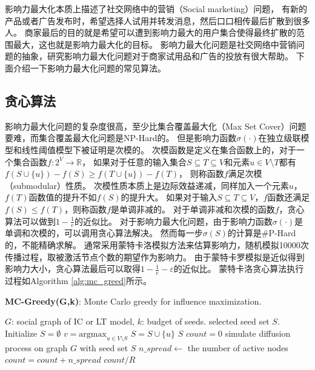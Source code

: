影响力最大化本质上描述了社交网络中的营销（Social marketing）问题，
有新的产品或者广告发布时，希望选择人试用并转发消息，然后口口相传最后扩散到很多人。
商家最后的目的就是希望可以遭到影响力最大的用户集合使得最终扩散的范围最大，这也就是影响力最大化的目标。
影响力最大化问题是社交网络中营销问题的抽象，研究影响力最大化问题对于商家试用品和广告的投放有很大帮助。
下面介绍一下影响力最大化问题的常见算法。

\subsection{贪心算法}
影响力最大化问题的复杂度很高，至少比集合覆盖最大化（Max Set Cover）问题要难，而集合覆盖最大化问题是NP-Hard的。
但是影响力函数$\sigma(\cdot)$在独立级联模型和线性阈值模型下被证明是次模的\cite{Kempe2003maximizing}。
次模函数是定义在集合函数上的，对于一个集合函数$f:2^V \to \mathbb{R}$，
如果对于任意的输入集合$S \subseteq T \subseteq V$和元素$u \in V \setminus T$都有
$f(S \cup \{u\}) - f(S) \geq f(T \cup \{u\}) - f(T)$，
则称函数$f$满足次模（submodular）性质。
次模性质本质上是边际效益递减，同样加入一个元素$u$，$f(T)$函数值的提升不如$f(S)$的提升大。
如果对于输入$S \subseteq T \subseteq V$，$f$函数还满足$f(S) \leq f(T)$，则称函数$f$是单调非减的。
对于单调非减和次模的函数$f$，贪心算法可以做到$1-\frac{1}{e}$的近似比。
对于影响力最大化问题，由于影响力函数$\sigma(\cdot)$是单调和次模的，可以调用贪心算法解决。
然而每一步$\sigma(S)$的计算是$\#$P-Hard的，不能精确求解。
通常采用蒙特卡洛模拟方法来估算影响力，随机模拟10000次传播过程，取被激活节点个数的期望作为影响力。
由于蒙特卡罗模拟是近似得到影响力大小，贪心算法最后可以取得$1-\frac{1}{e}-\varepsilon$的近似比。
蒙特卡洛贪心算法执行过程如Algorithm \ref{alg:mc_greed}所示。

\begin{algorithm}[h]
	\caption{\textbf{MC-Greedy(G,k)}: Monte Carlo greedy for influence maximization.}
	\label{alg:mc_greed} 
	\begin{algorithmic}[1]
		\Require $G$: social graph of IC or LT model, $k$: budget of seeds.
		\Ensure selected seed set $S$.
		\State Initialize $S = \emptyset$
			\State $v = \mathrm{argmax}_{u \in V \setminus S}$ 
			\State $S = S \cup \{u\}$
		\EndFor
		\State \Return $S$
			\State $count=0$
				\State simulate diffusion process on graph $G$ with seed set $S$
				\State $n\_spread \gets$ the number of active nodes
				\State $count = count + n\_spread$
			\EndFor
			\State \Return $count/R$
		\EndFunction
	\end{algorithmic} 
\end{algorithm}

